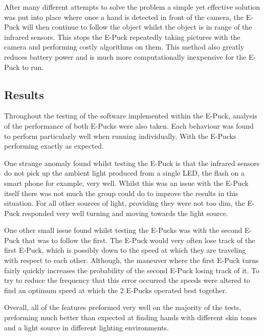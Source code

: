 After many different attempts to solve the problem a simple yet effective solution was put into place where once a hand is detected in front of the camera, the E-Puck will then continue to follow the object whilst the object is in range of the infrared sensors. This stops the E-Puck repeatedly taking pictures with the camera and performing costly algorithms on them. This method also greatly reduces battery power and is much more computationally inexpensive for the E-Puck to run.

\subsection{Results}
\label{sec:Results}
Throughout the testing of the software implemented within the E-Puck, analysis of the performance of both E-Pucks were also taken. Each behaviour was found to perform particularly well when running individually. With the E-Pucks performing exactly as expected.

One strange anomaly found whilst testing the E-Puck is that the infrared sensors do not pick up the ambient light produced from a single LED, the flash on a smart phone for example, very well. Whilst this was an issue with the E-Puck itself there was not much the group could do to improve the results in this situation. For all other sources of light, providing they were not too dim, the E-Puck responded very well turning and moving towards the light source.

One other small issue found whilst testing the E-Pucks was with the second E-Puck that was to follow the first. The E-Puck would very often lose track of the first E-Puck, which is possibly down to the speed at which they are traveling with respect to each other. Although, the maneuver where the first E-Puck turns fairly quickly increases the probability of the second E-Puck losing track of it. To try to reduce the frequency that this error occurred the speeds were altered to find an optimum speed at which the 2 E-Pucks operated best together. 

Overall, all of the features preformed very well on the majority of the tests, preforming much better than expected at finding hands with different skin tones and a light source in different lighting environments.